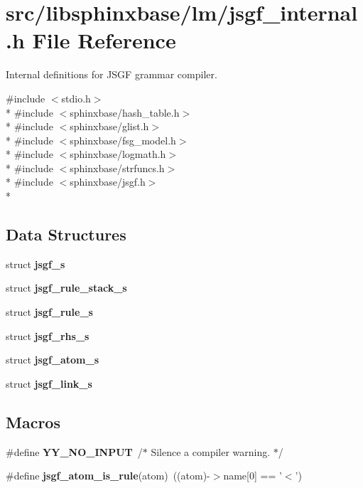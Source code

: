\section{src/libsphinxbase/lm/jsgf\-\_\-internal.h File Reference}
\label{jsgf__internal_8h}


Internal definitions for J\-S\-G\-F grammar compiler.  


{\ttfamily \#include $<$stdio.\-h$>$}\\*
{\ttfamily \#include $<$sphinxbase/hash\-\_\-table.\-h$>$}\\*
{\ttfamily \#include $<$sphinxbase/glist.\-h$>$}\\*
{\ttfamily \#include $<$sphinxbase/fsg\-\_\-model.\-h$>$}\\*
{\ttfamily \#include $<$sphinxbase/logmath.\-h$>$}\\*
{\ttfamily \#include $<$sphinxbase/strfuncs.\-h$>$}\\*
{\ttfamily \#include $<$sphinxbase/jsgf.\-h$>$}\\*
\subsection*{Data Structures}
\begin{DoxyCompactItemize}
\item 
struct {\bf jsgf\-\_\-s}
\item 
struct {\bf jsgf\-\_\-rule\-\_\-stack\-\_\-s}
\item 
struct {\bf jsgf\-\_\-rule\-\_\-s}
\item 
struct {\bf jsgf\-\_\-rhs\-\_\-s}
\item 
struct {\bf jsgf\-\_\-atom\-\_\-s}
\item 
struct {\bf jsgf\-\_\-link\-\_\-s}
\end{DoxyCompactItemize}
\subsection*{Macros}
\begin{DoxyCompactItemize}
\item 
\#define {\bfseries Y\-Y\-\_\-\-N\-O\-\_\-\-I\-N\-P\-U\-T}~/$\ast$ Silence a compiler warning. $\ast$/\label{jsgf__internal_8h_a85523a0c7d95c059d251b4e9829947aa}

\item 
\#define {\bfseries jsgf\-\_\-atom\-\_\-is\-\_\-rule}(atom)~((atom)-\/$>$name[0] == '$<$')\label{jsgf__internal_8h_ac4452bbb59863e64d73f4fe2d6cd394f}

\end{DoxyCompactItemize}
